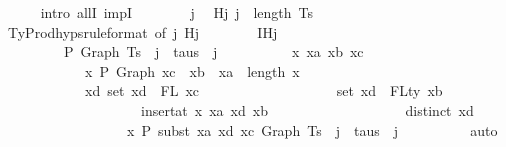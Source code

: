 \begin{isabellebody}
\ \ \ \ \isamarkupfalse%
\ {\isacharparenleft}{\kern0pt}intro\ allI\ impI{\isacharparenright}{\kern0pt}\isanewline
\ \ \ \ \ \ \isamarkupfalse%
\ j\ \isamarkupfalse%
\ Hj{\isacharcolon}{\kern0pt}\ {\isachardoublequoteopen}j\ {\isacharless}{\kern0pt}\ length\ Ts{\isachardoublequoteclose}\isanewline
\isanewline
\ \ \ \ \ \ \isanewline
\ \ \ \ \ \ \isamarkupfalse%
\ TyProd{\isachardot}{\kern0pt}hyps{\isacharparenleft}{\kern0pt}{}{\isacharparenright}{\kern0pt}{\isacharbrackleft}{\kern0pt}rule{\isacharunderscore}{\kern0pt}format{\isacharcomma}{\kern0pt}\ of\ j{\isacharbrackright}{\kern0pt}\ Hj\isanewline
\ \ \ \ \ \ \isamarkupfalse%
\ IHj{\isacharcolon}{\kern0pt}\isanewline
\ \ \ \ \ \ \ \ {\isachardoublequoteopen}{\isasymGamma}\ {\isasymturnstile}{\isacharbraceleft}{\kern0pt}P{\isacharbraceright}{\kern0pt}\ Graph\ {\isacharparenleft}{\kern0pt}Ts\ {\isacharbang}{\kern0pt}\ j{\isacharparenright}{\kern0pt}\ {\isacharcolon}{\kern0pt}\ taus\ {\isacharbang}{\kern0pt}\ j\ {\isasymand}\isanewline
\ \ \ \ \ \ \ \ \ {\isacharparenleft}{\kern0pt}{\isasymforall}x\ xa\ xb\ xc{\isachardot}{\kern0pt}\isanewline
\ \ \ \ \ \ \ \ \ \ \ \ x\ {\isasymturnstile}{\isacharbraceleft}{\kern0pt}P{\isacharbraceright}{\kern0pt}\ Graph\ xc\ {\isacharcolon}{\kern0pt}\ xb\ {\isasymlongrightarrow}\ xa\ {\isasymle}\ length\ x\ {\isasymlongrightarrow}\isanewline
\ \ \ \ \ \ \ \ \ \ \ \ {\isacharparenleft}{\kern0pt}{\isasymforall}xd{\isachardot}{\kern0pt}\ set\ xd\ {\isacharequal}{\kern0pt}\ FL\ xc\ {\isasymlongrightarrow}\isanewline
\ \ \ \ \ \ \ \ \ \ \ \ \ \ \ \ \ \ set\ xd\ {\isacharequal}{\kern0pt}\ FLty\ xb\ {\isasymlongrightarrow}\isanewline
\ \ \ \ \ \ \ \ \ \ \ \ \ \ \ \ \ \ {\isasymGamma}\ {\isacharequal}{\kern0pt}\ insert{\isacharunderscore}{\kern0pt}at\ x\ xa\ {\isacharparenleft}{\kern0pt}xd{\isacharcomma}{\kern0pt}\ xb{\isacharparenright}{\kern0pt}\ {\isasymlongrightarrow}\isanewline
\ \ \ \ \ \ \ \ \ \ \ \ \ \ \ \ \ \ distinct\ xd\ {\isasymlongrightarrow}\isanewline
\ \ \ \ \ \ \ \ \ \ \ \ \ \ \ \ \ \ x\ {\isasymturnstile}{\isacharbraceleft}{\kern0pt}P{\isacharbraceright}{\kern0pt}\ subst\ xa\ xd\ xc\ {\isacharparenleft}{\kern0pt}Graph\ {\isacharparenleft}{\kern0pt}Ts\ {\isacharbang}{\kern0pt}\ j{\isacharparenright}{\kern0pt}{\isacharparenright}{\kern0pt}\ {\isacharcolon}{\kern0pt}\ taus\ {\isacharbang}{\kern0pt}\ j{\isacharparenright}{\kern0pt}{\isacharparenright}{\kern0pt}{\isachardoublequoteclose}\isanewline
\ \ \ \ \ \ \ \ \isamarkupfalse%
\ auto\isanewline

\end{isabellebody}
